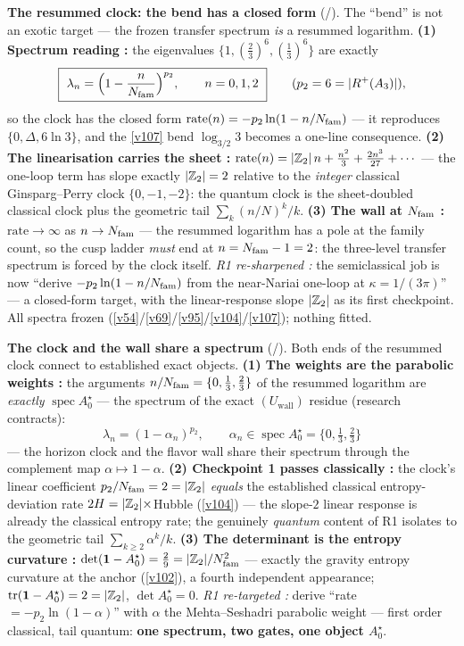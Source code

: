

\par\smallskip\noindent\textbf{The resummed clock: the bend has a closed form} (\mE/\mC).
The ``bend'' is not an exotic target --- the frozen transfer spectrum \emph{is} a resummed logarithm.
\textbf{(1) Spectrum reading \mE:} the eigenvalues $\{1,(\tfrac23)^6,(\tfrac13)^6\}$ are exactly
\[
  \boxed{\ \lambda_n=\Bigl(1-\frac n{\Nfam}\Bigr)^{p_2},\qquad n=0,1,2\ }
  \qquad(p_2=6=|R^+(A_3)|),
\]
so the clock has the closed form $\mathrm{rate}(n)=-p_2\ln(1-n/N_{\mathrm{fam}})$ --- it reproduces
$\{0,\Delta,6\ln3\}$, and the \vref{v107} bend $\log_{3/2}3$ becomes a one-line consequence. \textbf{(2) The
linearisation carries the sheet \mE:} $\mathrm{rate}(n)=|\mathbb{Z}_2|\,n+\tfrac{n^2}3+\tfrac{2n^3}{27}+\cdots$
--- the one-loop term has slope exactly $|\mathbb{Z}_2|=2$ relative to the \emph{integer} classical
Ginsparg--Perry clock $\{0,-1,-2\}$: the quantum clock is the sheet-doubled classical clock plus the
geometric tail $\sum_k(n/N)^k/k$. \textbf{(3) The wall at $N_{\mathrm{fam}}$ \mE:} $\mathrm{rate}\to\infty$ as
$n\to N_{\mathrm{fam}}$ --- the resummed logarithm has a pole at the family count, so the cusp ladder \emph{must}
end at $n=N_{\mathrm{fam}}-1=2$: the three-level transfer spectrum is forced by the clock itself. \emph{R1
re-sharpened \mC:} the semiclassical job is now ``derive $-p_2\ln(1-n/N_{\mathrm{fam}})$ from the near-Nariai
one-loop at $\kappa=1/(3\pi)$'' --- a closed-form target, with the linear-response slope $|\mathbb{Z}_2|$ as
its first checkpoint. All spectra frozen (\vref{v54}/\vref{v69}/\vref{v95}/\vref{v104}/\vref{v107}); nothing fitted. 


\par\smallskip\noindent\textbf{The clock and the wall share a spectrum} (\mE/\mC).
Both ends of the resummed clock connect to established exact objects. \textbf{(1) The weights are the
parabolic weights \mE:} the arguments $n/N_{\mathrm{fam}}=\{0,\tfrac13,\tfrac23\}$ of the resummed logarithm are
\emph{exactly} $\operatorname{spec}A_0^\star$ --- the spectrum of the exact $(U_{\mathrm{wall}})$
residue (research contracts):
\[
  \boxed{\ \lambda_n=(1-\alpha_n)^{p_2},\qquad \alpha_n\in\operatorname{spec}A_0^\star=\{0,\tfrac13,\tfrac23\}\ }
\]
--- the horizon clock and the flavor wall share their spectrum through the complement map
$\alpha\mapsto1-\alpha$. \textbf{(2) Checkpoint 1 passes classically \mE:} the clock's linear
coefficient $p_2/N_{\mathrm{fam}}=2=|\mathbb{Z}_2|$ \emph{equals} the established classical entropy-deviation rate
$2H=|\mathbb{Z}_2|\times$Hubble (\vref{v104}) --- the slope-$2$ linear response is already the classical entropy
rate; the genuinely \emph{quantum} content of R1 isolates to the geometric tail
$\sum_{k\ge2}\alpha^k/k$. \textbf{(3) The determinant is the entropy curvature \mE:}
$\det(\mathbf1-A_0^\star)=\tfrac29=|\mathbb{Z}_2|/N_{\mathrm{fam}}^2$ --- exactly the gravity entropy curvature at the
anchor (\vref{v102}), a fourth independent appearance; $\operatorname{tr}(\mathbf1-A_0^\star)=2=|\mathbb{Z}_2|$,
$\det A_0^\star=0$. \emph{R1 re-targeted \mC:} derive ``rate $=-p_2\ln(1-\alpha)$'' with $\alpha$ the
Mehta--Seshadri parabolic weight --- first order classical, tail quantum: \textbf{one spectrum, two
gates, one object $A_0^\star$}. 


